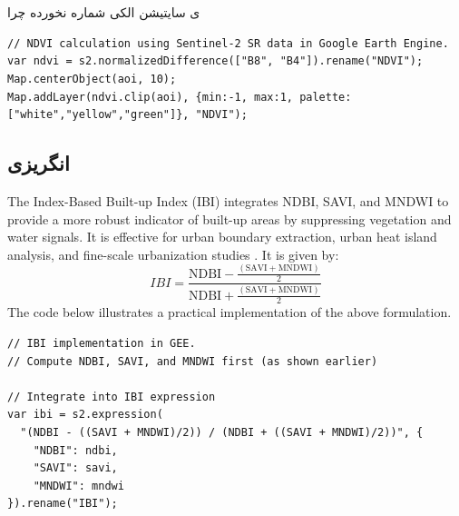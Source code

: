 \chapter{ }\label{chp:4}
ی سایتیشن الکی
 \citep{persian_key} شماره نخورده چرا
\begin{latin}
\begin{tcolorbox}[geecode] 
\begin{lstlisting}[language=GEEJS]
// NDVI calculation using Sentinel-2 SR data in Google Earth Engine.
var ndvi = s2.normalizedDifference(["B8", "B4"]).rename("NDVI");
Map.centerObject(aoi, 10);
Map.addLayer(ndvi.clip(aoi), {min:-1, max:1, palette:["white","yellow","green"]}, "NDVI");
\end{lstlisting}
\end{tcolorbox}
\end{latin}

\section{انگریزی}

\begin{latin}
The Index-Based Built-up Index (IBI) integrates NDBI, SAVI, and MNDWI to provide \citep{english_key} a more robust indicator of built-up areas by suppressing vegetation and water signals. It is effective for urban boundary extraction, urban heat island analysis, and fine-scale urbanization studies \citep{zha2003}. It is given by:
\begin{equation}
\label{eq:ibi}
IBI = \frac{\mathrm{NDBI} - \frac{(\mathrm{SAVI} + \mathrm{MNDWI})}{2}}{\mathrm{NDBI} + \frac{(\mathrm{SAVI} + \mathrm{MNDWI})}{2}}
\end{equation}
The code below illustrates a practical implementation of the above formulation.
\begin{tcolorbox}[geecode]  
\begin{lstlisting}[language=GEEJS] 
// IBI implementation in GEE.
// Compute NDBI, SAVI, and MNDWI first (as shown earlier)

// Integrate into IBI expression
var ibi = s2.expression(
  "(NDBI - ((SAVI + MNDWI)/2)) / (NDBI + ((SAVI + MNDWI)/2))", {
    "NDBI": ndbi,
    "SAVI": savi,
    "MNDWI": mndwi
}).rename("IBI");
\end{lstlisting} 
\end{tcolorbox}
\end{latin}
